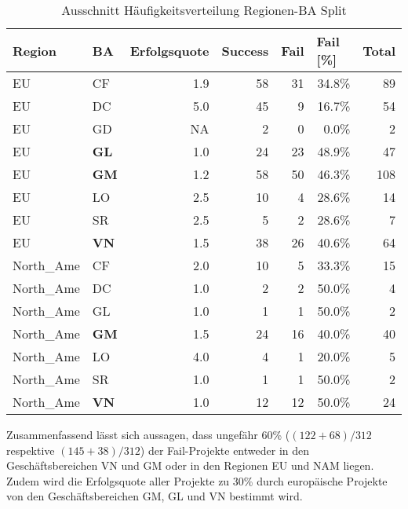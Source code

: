 \begin{table}[H]
	\centering
	\caption{Ausschnitt Häufigkeitsverteilung Regionen-BA Split}
	\begin{tabular}{llrrrrr}
		\textbf{Region} & \textbf{BA}    & \multicolumn{1}{l}{\textbf{Erfolgsquote}} & \multicolumn{1}{l}{\textbf{Success}} & \multicolumn{1}{l}{\textbf{Fail}} & \multicolumn{1}{l}{\textbf{Fail [\%]}} & \multicolumn{1}{l}{\textbf{Total}} \\\hline
		EU    & CF    & 1.9   & 58    & 31    & 34.8\% & 89 \\
		EU    & DC    & 5.0   & 45    & 9     & 16.7\% & 54 \\
		EU    & GD    & NA    & 2     & 0     & 0.0\% & 2 \\
		EU    & \textbf{GL}    & 1.0   & 24    & 23    & 48.9\% & 47 \\
		EU    & \textbf{GM}  & 1.2   & 58    & 50    & 46.3\% & 108 \\
		EU    & LO    & 2.5   & 10    & 4     & 28.6\% & 14 \\
		EU    & SR    & 2.5   & 5     & 2     & 28.6\% & 7 \\
		EU    & \textbf{VN}     & 1.5   & 38    & 26    & 40.6\% & 64 \\\hline
		North\_Ame & CF    & 2.0   & 10    & 5     & 33.3\% & 15 \\
		North\_Ame & DC    & 1.0   & 2     & 2     & 50.0\% & 4 \\
		North\_Ame & GL    & 1.0   & 1     & 1     & 50.0\% & 2 \\
		North\_Ame & \textbf{GM}   & 1.5   & 24    & 16    & 40.0\% & 40 \\
		North\_Ame & LO    & 4.0   & 4     & 1     & 20.0\% & 5 \\
		North\_Ame & SR    & 1.0   & 1     & 1     & 50.0\% & 2 \\
		North\_Ame & \textbf{VN}  & 1.0   & 12    & 12    & 50.0\% & 24 \\
	\end{tabular}%
	\label{tab:fregba}%
\end{table}%
Zusammenfassend lässt sich aussagen, dass ungefähr 60\% ($(122+68)/312$ respektive $(145+38)/312$) der Fail-Projekte entweder in den Geschäftsbereichen VN und GM oder in den Regionen EU und NAM liegen. Zudem wird die Erfolgsquote aller Projekte zu 30\% durch europäische Projekte von den Geschäftsbereichen GM, GL und VN bestimmt wird.
%
%
